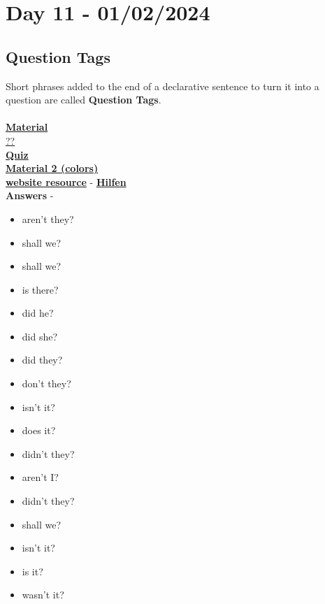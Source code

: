 \documentclass[a4paper,30pt]{report}
\begin{document}
  
  \chapter{Day 11 - 01/02/2024} %
  \label{chap:Day 11 - 01/02/2024}
    \section{Question Tags} %
    \label{sec:Question Tags}
      Short phrases added to the end of a declarative sentence to turn it into a question are called \textbf{Question Tags}.\\\\
      \href{https://continuingstudies.uvic.ca/elc/studyzone/410/grammar/410-tag-questions/}{\textbf{Material}}\\
      \href{https://www.englishreservoir.com/advanced-english-grammar/question-tags/?authuser=1}{??}\\
      \href{https://englishsmarts.com/2015/10/14/esl-grammar-exercise-advanced-question-tags-1/}{\textbf{Quiz}}\\
      \href{https://www.englisch-hilfen.de/en/grammar/qu_tags.htm}{\textbf{Material 2 (colors)}}\\
      \textbf{\underline{website resource}} - \href{https://www.englisch-hilfen.de/en/sitemap.htm}{\textbf{Hilfen}}\\

      \textbf{Answers} - 
      \begin{itemize}
        \item aren't they?
        \item shall we?
        \item shall we?
        \item is there?
        \item did he?
        \item did she?
        \item did they?
        \item don't they?
        \item isn't it?
        \item does it?
        \item didn't they?
        \item aren't I?
        \item didn't they?
        \item shall we?
        \item isn't it?
        \item is it?
        \item wasn't it?
      \end{itemize}
\end{document}
